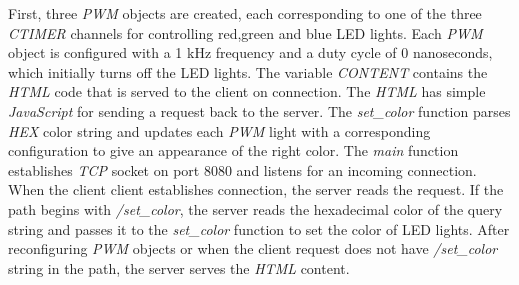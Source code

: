 \documentclass[twoside, 12pt]{article}
\begin{document}
First, three \textit{PWM} objects are created, each corresponding to one of the three 
\textit{CTIMER} channels for controlling red,green and blue LED lights. Each \textit{PWM} 
object is configured with a 1 kHz frequency and a duty cycle of 0 nanoseconds, which 
initially turns off the LED lights. The variable \textit{CONTENT} contains the \textit{HTML} 
code that is served to the client on connection. The \textit{HTML} has simple 
\textit{JavaScript} for sending a request back to the server. The \textit{set\_color} 
function parses \textit{HEX} color string and updates each \textit{PWM} light with a
corresponding configuration to give an appearance of the right color. The \textit{main} 
function establishes \textit{TCP} socket on port 8080 and listens for an incoming
connection. When the client client establishes connection, the server reads the request. If
the path begins with \textit{/set\_color}, the server reads the hexadecimal color of the
query string and passes it to the \textit{set\_color} function to set the color of LED 
lights. After reconfiguring \textit{PWM} objects or when the client request does not have 
\textit{/set\_color} string in the path, the server serves the \textit{HTML} content.
\end{document}
